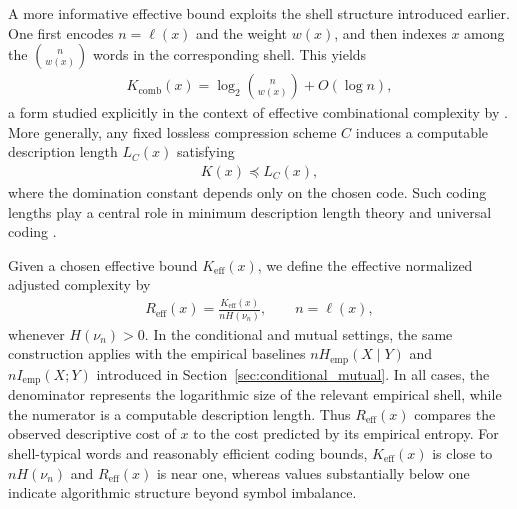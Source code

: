 \documentclass[12pt]{article}
\begin{document}
A more informative effective bound exploits the shell structure introduced
earlier. One first encodes $n=\ell(x)$ and the weight $w(x)$, and then indexes
$x$ among the $\binom{n}{w(x)}$ words in the corresponding shell. This yields
\begin{eqnarray}
K_{\mathrm{comb}}(x)
=
\log_2\binom{n}{w(x)}+O(\log n),
\end{eqnarray}
a form studied explicitly in the context of effective combinational complexity
by \citet{StojanovicVidakovic1987}. More generally, any fixed lossless
compression scheme $C$ induces a computable description length $L_C(x)$
satisfying
\begin{eqnarray}
K(x) \preceq L_C(x),
\end{eqnarray}
where the domination constant depends only on the chosen code. Such coding
lengths play a central role in minimum description length theory and universal
coding \citep{Grunwald2007}.

Given a chosen effective bound $K_{\mathrm{eff}}(x)$, we define the effective
normalized adjusted complexity by
\begin{eqnarray}
R_{\mathrm{eff}}(x)
=
\frac{K_{\mathrm{eff}}(x)}{nH(\nu_n)},
\qquad n=\ell(x),
\label{eq:Reff_testing_clean}
\end{eqnarray}
whenever $H(\nu_n)>0$. In the conditional and mutual settings, the same
construction applies with the empirical baselines
$nH_{\mathrm{emp}}(X\mid Y)$ and $nI_{\mathrm{emp}}(X;Y)$ introduced in
Section~\ref{sec:conditional_mutual}. In all cases, the denominator represents
the logarithmic size of the relevant empirical shell, while the numerator is a
computable description length. Thus $R_{\mathrm{eff}}(x)$ compares the observed
descriptive cost of $x$ to the cost predicted by its empirical entropy. For
shell-typical words and reasonably efficient coding bounds,
$K_{\mathrm{eff}}(x)$ is close to $nH(\nu_n)$ and $R_{\mathrm{eff}}(x)$ is near
one, whereas values substantially below one indicate algorithmic structure
beyond symbol imbalance.
\end{document}
